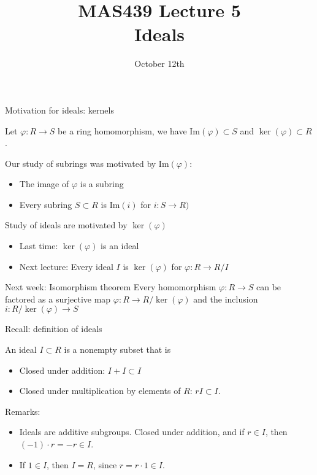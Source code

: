 \documentclass{beamer}
\title{MAS439 Lecture 5 \\ Ideals}
\date{October 12th}
\begin{document}
\begin{frame}
\titlepage
\end{frame}


\begin{frame}{Motivation for ideals: kernels}

Let $\varphi:R\to S$ be a ring homomorphism, we have $\textrm{Im}(\varphi)\subset S$ and $\ker(\varphi)\subset R$.

\begin{block}{Our study of subrings was motivated by $\textrm{Im}(\varphi)$:}
\begin{itemize}
\item The image of $\varphi$ is a subring
\item Every subring $S\subset R$ is $\textrm{Im}(i)$ for $i:S\to R)$
\end{itemize}
\end{block}

\begin{block}{Study of ideals are motivated by $\ker(\varphi)$}
\begin{itemize}
\item Last time: $\ker(\varphi)$ is an ideal
\item Next lecture: Every ideal $I$ is $\ker(\varphi)$ for $\varphi:R\to R/I$
\end{itemize}
\end{block}

\begin{block}{Next week: Isomorphism theorem}
Every homomorphism $\varphi:R\to S$ can be factored as a surjective map $\varphi:R\to R/\ker(\varphi)$ and the inclusion $i:R/\ker(\varphi)\to S$
\end{block}
\end{frame}


\begin{frame}{Recall: definition of ideals}
\begin{definition}
An ideal $I\subset R$ is a nonempty subset that is

\begin{itemize}
\item Closed under addition: $I+I\subset I$
\item Closed under multiplication by elements of $R$: $rI\subset I$.
\end{itemize}
\end{definition}

\begin{block}{Remarks:}
\begin{itemize}
\item Ideals are additive subgroups.  Closed under addition, and if $r\in I$, then $(-1)\cdot r=-r\in I$.
\item If $1\in I$, then $I=R$, since $r=r\cdot 1\in I$.
\end{itemize}

\end{block}

\end{frame}
\end{document}
